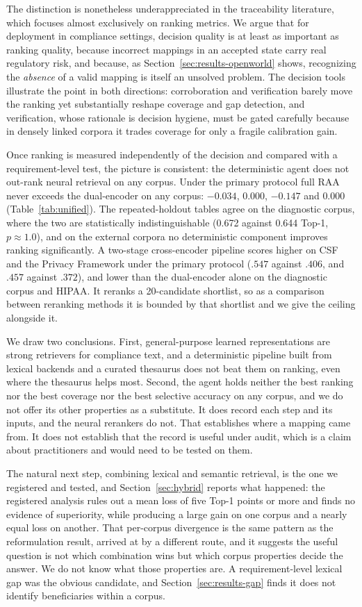 \documentclass[smallextended,natbib]{svjour3}
\begin{document}
The distinction is nonetheless underappreciated in the traceability literature, which focuses almost exclusively on ranking metrics.
We argue that for deployment in compliance settings, decision quality is at least as important as ranking quality, because incorrect mappings in an accepted state carry real regulatory risk, and because, as Section~\ref{sec:results-openworld} shows, recognizing the \emph{absence} of a valid mapping is itself an unsolved problem.
The decision tools illustrate the point in both directions: corroboration and verification barely move the ranking yet substantially reshape coverage and gap detection, and verification, whose rationale is decision hygiene, must be gated carefully because in densely linked corpora it trades coverage for only a fragile calibration gain.

Once ranking is measured independently of the decision and compared with a requirement-level test, the picture is consistent: the deterministic agent does not out-rank neural retrieval on any corpus.
Under the primary protocol full RAA never exceeds the dual-encoder on any corpus: $-0.034$, $0.000$, $-0.147$ and $0.000$ (Table~\ref{tab:unified}). The repeated-holdout tables agree on the diagnostic corpus, where the two are statistically indistinguishable (0.672 against 0.644 Top-1, $p\approx1.0$), and on the external corpora no deterministic component improves ranking significantly.
A two-stage cross-encoder pipeline scores higher on CSF and the Privacy Framework under the primary protocol ($.547$ against $.406$, and $.457$ against $.372$), and lower than the dual-encoder alone on the diagnostic corpus and HIPAA. It reranks a 20-candidate shortlist, so as a comparison between reranking methods it is bounded by that shortlist and we give the ceiling alongside it.

We draw two conclusions.
First, general-purpose learned representations are strong retrievers for compliance text, and a deterministic pipeline built from lexical backends and a curated thesaurus does not beat them on ranking, even where the thesaurus helps most.
Second, the agent holds neither the best ranking nor the best coverage nor the best selective accuracy on any corpus, and we do not offer its other properties as a substitute.
It does record each step and its inputs, and the neural rerankers do not. That establishes where a mapping came from. It does not establish that the record is useful under audit, which is a claim about practitioners and would need to be tested on them.

The natural next step, combining lexical and semantic retrieval, is the one we registered and tested, and Section~\ref{sec:hybrid} reports what happened: the registered analysis rules out a mean loss of five Top-1 points or more and finds no evidence of superiority, while producing a large gain on one corpus and a nearly equal loss on another. That per-corpus divergence is the same pattern as the reformulation result, arrived at by a different route, and it suggests the useful question is not which combination wins but which corpus properties decide the answer. We do not know what those properties are. A requirement-level lexical gap was the obvious candidate, and Section~\ref{sec:results-gap} finds it does not identify beneficiaries within a corpus.
\end{document}
